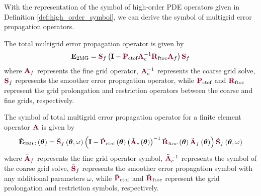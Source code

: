 With the representation of the symbol of high-order PDE operators given in Definition \ref{def:high_order_symbol}, we can derive the symbol of multigrid error propagation operators.

The total multigrid error propagation operator is given by
\begin{equation}
\mathbf{E}_{\text{2MG}} = {\color{burgundy}\mathbf{S}}_f \left( \mathbf{I} - {\color{burgundy}\mathbf{P}}_{\text{ctof}} {\color{burgundy}\mathbf{A}}_c^{-1} {\color{burgundy}\mathbf{R}}_{\text{ftoc}} {\color{burgundy}\mathbf{A}}_f \right) {\color{burgundy}\mathbf{S}}_f
\end{equation}
where ${\color{burgundy}\mathbf{A}}_f$ represents the fine grid operator, ${\color{burgundy}\mathbf{A}}_c^{-1}$ represents the coarse grid solve, ${\color{burgundy}\mathbf{S}}_f$ represents the smoother error propagation operator, while ${\color{burgundy}\mathbf{P}}_{\text{ctof}}$ and ${\color{burgundy}\mathbf{R}}_{\text{ftoc}}$ represent the grid prolongation and restriction operators between the coarse and fine grids, respectively.

\begin{definition}
The symbol of total multigrid error propagation operator for a finite element operator ${\color{burgundy}\mathbf{A}}$ is given by
\begin{equation}
\tilde{\mathbf{E}}_{\text{2MG}} \left( \boldsymbol{\theta} \right) = \tilde{{\color{burgundy}\mathbf{S}}}_f \left( \boldsymbol{\theta}, \omega \right) \left( \mathbf{I} - \tilde{{\color{burgundy}\mathbf{P}}}_{\text{ctof}} \left( \boldsymbol{\theta} \right) \left(\tilde{{\color{burgundy}\mathbf{A}}}_c \left( \boldsymbol{\theta} \right) \right)^{-1} \tilde{{\color{burgundy}\mathbf{R}}}_{\text{ftoc}} \left( \boldsymbol{\theta} \right) \tilde{{\color{burgundy}\mathbf{A}}}_f \left( \boldsymbol{\theta} \right) \right) \tilde{{\color{burgundy}\mathbf{S}}}_f \left( \boldsymbol{\theta}, \omega \right)
\end{equation}
where $\tilde{\color{burgundy}\mathbf{A}}_f$ represents the fine grid operator symbol, $\tilde{\color{burgundy}\mathbf{A}}_c^{-1}$ represents the symbol of the coarse grid solve, $\tilde{{\color{burgundy}\mathbf{S}}}_f$ represents the smoother error propagation symbol with any additional parameters $\omega$, while $\tilde{{\color{burgundy}\mathbf{P}}}_{\text{ctof}}$ and $\tilde{{\color{burgundy}\mathbf{R}}}_{\text{ftoc}}$ represent the grid prolongation and restriction symbols, respectively.
\label{def:multigrid_symbol}
\end{definition}

